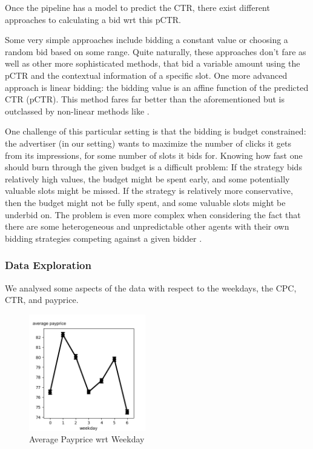 \documentclass{sig-alternate-05-2015}
\begin{document}
Once the pipeline has a model to predict the CTR, there exist different approaches to calculating a bid wrt this pCTR.



Some very simple approaches include bidding a constant value or choosing a random bid based on some range.
Quite naturally, these approaches don't fare as well as other more sophisticated methods, that bid a variable amount using the pCTR and the contextual information of a specific slot.  \cite{ORTB}
One more advanced approach is linear bidding: the bidding value is an affine function of the predicted CTR (pCTR).
This method fares far better than the aforementioned but is outclassed by non-linear methods like \cite{ORTB}.


One challenge of this particular setting is that the bidding is budget constrained:
the advertiser (in our setting) wants to maximize the number of clicks it gets from its impressions, for some number of slots it bids for.
Knowing how fast one should burn through the given budget is a difficult problem\cite{BID1}:
If the strategy bids relatively high values, the budget might be spent early, and some potentially valuable slots might be missed.
If the strategy is relatively more conservative, then the budget might not be fully spent, and some valuable slots might be underbid on.
The problem is even more complex when considering the fact that there are some heterogeneous and unpredictable other agents with their own bidding strategies competing against a given bidder \cite{BID1}.



\subsubsection{Data Exploration}

We analysed some aspects of the data with respect to the weekdays, the CPC, CTR, and payprice.

\begin{figure}
\centering
\includegraphics[height=2in, width=2in]{images/weekday_AC.png}
\caption{Average Payprice wrt Weekday}
\end{figure}
\end{document}
